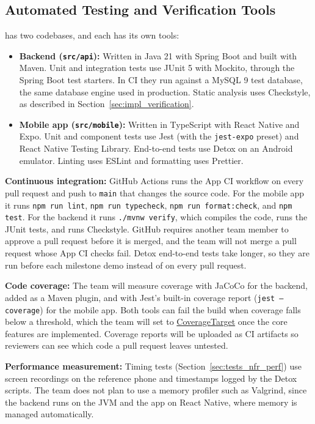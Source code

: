 \documentclass[12pt, titlepage]{article}
\newcommand{\const}[1]{\hyperlink{const:#1}{\textsf{#1}}}
\begin{document}
\subsection{Automated Testing and Verification Tools}\label{sec:auto_tools}

\progname{} has two codebases, and each has its own tools:
\begin{itemize}
  \item \textbf{Backend (\texttt{src/api}):} Written in Java 21 with Spring
  Boot and built with Maven. Unit and integration tests use JUnit 5 with
  Mockito, through the Spring Boot test starters. In CI they run against a
  MySQL 9 test database, the same database engine used in production. Static analysis uses Checkstyle, as described in
  Section~\ref{sec:impl_verification}.
  \item \textbf{Mobile app (\texttt{src/mobile}):} Written in TypeScript with
  React Native and Expo. Unit and component tests use Jest (with the
  \texttt{jest-expo} preset) and React Native Testing Library. End-to-end tests
  use Detox on an Android emulator. Linting uses ESLint and formatting uses
  Prettier.
\end{itemize}

\textbf{Continuous integration:} GitHub Actions runs the App CI workflow on
every pull request and push to \texttt{main} that changes the source code. For the mobile app it runs \texttt{npm run lint},
\texttt{npm run typecheck}, \texttt{npm run format:check}, and
\texttt{npm test}. For the backend it runs \texttt{./mvnw verify}, which
compiles the code, runs the JUnit tests, and runs Checkstyle. GitHub requires
another team member to approve a pull request before it is merged, and the
team will not merge a pull request whose App CI checks fail.
Detox end-to-end tests take longer, so they are run before each milestone
demo instead of on every pull request.

\textbf{Code coverage:} The team will measure coverage with JaCoCo for the
backend, added as a Maven plugin, and with Jest's built-in coverage report
(\texttt{jest --coverage}) for the mobile app. Both tools can fail the build
when coverage falls below a threshold, which the team will set to
\const{CoverageTarget} once the core features are implemented. Coverage
reports will be uploaded as CI artifacts so reviewers can see which code a
pull request leaves untested.

\textbf{Performance measurement:} Timing tests (Section~\ref{sec:tests_nfr_perf})
use screen recordings on the reference phone and timestamps logged by the
Detox scripts. The team does not plan to use a memory profiler such as
Valgrind, since the backend runs on the JVM and the app on React Native, where
memory is managed automatically.
\end{document}
